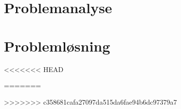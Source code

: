


\part{Problemanalyse} 






\part{Problemløsning}




<<<<<<< HEAD

=======

>>>>>>> c358681cafa27097da515da6fae94b6dc97379a7


